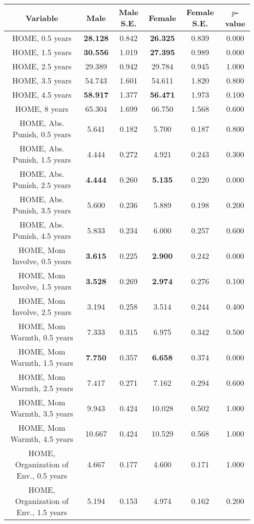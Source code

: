 \begin{longtable}{c c c c c c}
\toprule
\textbf{Variable} & \textbf{Male} & \textbf{Male S.E.}  & \textbf{Female} & \textbf{Female S.E.} & \textbf{$ p $-value} \\
\midrule
HOME, 0.5 years & \textbf{28.128} & 0.842 &  \textbf{26.325} & 0.839 & 0.000 \\
HOME, 1.5 years & \textbf{30.556} & 1.019 &  \textbf{27.395} & 0.989 & 0.000 \\
HOME, 2.5 years & 29.389 & 0.942 &  29.784 & 0.945 & 1.000 \\
HOME, 3.5 years & 54.743 & 1.601 &  54.611 & 1.820 & 0.800 \\
HOME, 4.5 years & \textbf{58.917} & 1.377 &  \textbf{56.471} & 1.973 & 0.100 \\
HOME, 8 years & 65.304 & 1.699 &  66.750 & 1.568 & 0.600 \\
HOME, Abs. Punish, 0.5 years & 5.641 & 0.182 &  5.700 & 0.187 & 0.800 \\
HOME, Abs. Punish, 1.5 years & 4.444 & 0.272 &  4.921 & 0.243 & 0.300 \\
HOME, Abs. Punish, 2.5 years & \textbf{4.444} & 0.260 &  \textbf{5.135} & 0.220 & 0.000 \\
HOME, Abs. Punish, 3.5 years & 5.600 & 0.236 &  5.889 & 0.198 & 0.200 \\
HOME, Abs. Punish, 4.5 years & 5.833 & 0.234 &  6.000 & 0.257 & 0.600 \\
HOME, Mom Involve, 0.5 years & \textbf{3.615} & 0.225 &  \textbf{2.900} & 0.242 & 0.000 \\
HOME, Mom Involve, 1.5 years & \textbf{3.528} & 0.269 &  \textbf{2.974} & 0.276 & 0.100 \\
HOME, Mom Involve, 2.5 years & 3.194 & 0.258 &  3.514 & 0.244 & 0.400 \\
HOME, Mom Warmth, 0.5 years & 7.333 & 0.315 &  6.975 & 0.342 & 0.500 \\
HOME, Mom Warmth, 1.5 years & \textbf{7.750} & 0.357 &  \textbf{6.658} & 0.374 & 0.000 \\
HOME, Mom Warmth, 2.5 years & 7.417 & 0.271 &  7.162 & 0.294 & 0.600 \\
HOME, Mom Warmth, 3.5 years & 9.943 & 0.424 &  10.028 & 0.502 & 1.000 \\
HOME, Mom Warmth, 4.5 years & 10.667 & 0.424 &  10.529 & 0.568 & 1.000 \\
HOME, Organization of Env., 0.5 years & 4.667 & 0.177 &  4.600 & 0.171 & 1.000 \\
HOME, Organization of Env., 1.5 years & 5.194 & 0.153 &  4.974 & 0.162 & 0.200 \\

\end{longtable}
